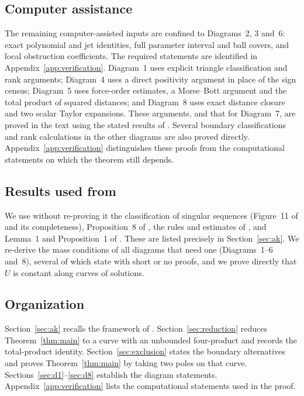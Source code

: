 \documentclass[11pt]{amsart}
\theoremstyle{definition}
\theoremstyle{remark}
\begin{document}
\subsection*{Computer assistance}
{The remaining computer-assisted inputs are confined to Diagrams~2, 3 and~6:
exact polynomial and jet identities, full parameter interval and ball covers, and local
obstruction coefficients.  The required statements are identified in
Appendix~\ref{app:verification}.  Diagram~1 uses explicit triangle classification and rank
arguments; Diagram~4 uses a direct positivity argument in place of the sign census;
Diagram~5 uses force-order estimates, a Morse--Bott argument and the total product of
squared distances; and Diagram~8 uses exact distance closure and two scalar Taylor expansions.
These arguments, and that for Diagram~7, are proved in the text using the stated results
of \cite{AK}.  Several boundary classifications and rank calculations in the other diagrams
are also proved directly.  Appendix~\ref{app:verification} distinguishes these proofs from
the computational statements on which the theorem still depends.

}\subsection*{Results used from \texorpdfstring{\cite{AK}}{Albouy and Kaloshin}}
We use without re-proving it the classification of singular sequences (Figure~11 of
\cite{AK} and its completeness), Proposition~8 of \cite{AK}, the rules and estimates of
\cite[\S3]{AK}, and Lemma~1 and Proposition~1 of \cite{AK}.  These are listed precisely in
Section~\ref{sec:ak}.  We re-derive the mass conditions of all diagrams that need one
(Diagrams~1--6 and~8), several of which \cite[\S\S8.3--8.8]{AK} state with short or no proofs,
and we prove directly that $U$ is constant along curves of solutions.

\subsection*{Organization}
{
Section~\ref{sec:ak} recalls the framework of \cite{AK}.  Section~\ref{sec:reduction} reduces
Theorem~\ref{thm:main} to a curve with an unbounded four-product and records the total-product
identity.  Section~\ref{sec:exclusion} states the boundary alternatives and proves
Theorem~\ref{thm:main} by taking two poles on that curve.  Sections~\ref{sec:d1}--\ref{sec:d8}
establish the diagram statements.  Appendix~\ref{app:verification} lists the computational statements used in the proof.
}
\end{document}

